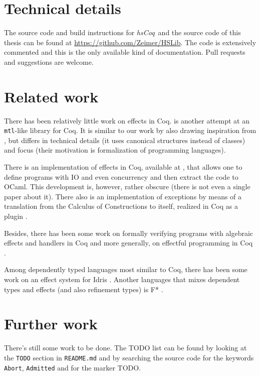 \documentclass[declaration,inz,english,shortabstract]{iithesis}
\newcommand{\libname}{\textit{hsCoq}}
\newcommand{\homepage}{\url{https://github.com/Zeimer/HSLib}}
\newcommand{\m}[1]{\texttt{#1}}
\begin{document}
\section{Technical details}

The source code and build instructions for \libname\ and the source code of this thesis can be found at \homepage. The code is extensively commented and this is the only available kind of documentation. Pull requests and suggestions are welcome.

\section{Related work}

There has been relatively little work on effects in Coq. \cite{MERC} is another attempt at an \m{mtl}-like library for Coq. It is similar to our work by also drawing inspiration from \cite{JustDoIt}, but differs in technical details (it uses canonical structures instead of classes) and focus (their motivation is formalization of programming languages).

There is an implementation of effects in Coq, available at \cite{CoqIO}, that allows one to define programs with IO and even concurrency and then extract the code to OCaml. This development is, however, rather obscure (there is not even a single paper about it). There also is an implementation of exceptions by means of a translation from the Calculus of Constructions to itself, realized in Coq as a plugin \cite{FailureIsNotAnOption}.

Besides, there has been some work on formally verifying programs with algebraic effects and handlers in Coq \cite{CoqEff1} \cite{CoqEff2} and more generally, on effectful programming in Coq \cite{CoqEff3}.

Among dependently typed languages most similar to Coq, there has been some work on an effect system for Idris \cite{IdrisEffects}. Another languages that mixes dependent types and effects (and also refinement types) is F* \cite{FStar}.

\section{Further work}

There's still some work to be done. The TODO list can be found by looking at the \m{TODO} section in \m{README.md} and by searching the source code for the keywords \m{Abort}, \m{Admitted} and for the marker TODO.
\end{document}
